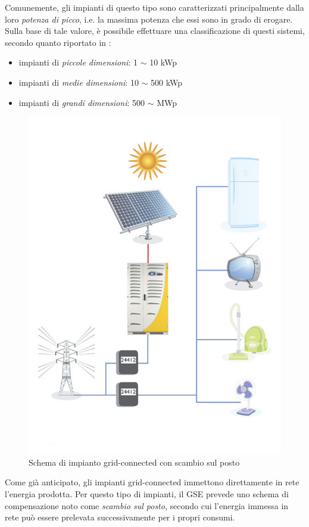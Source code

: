 %
Comunemente, gli impianti di questo tipo sono caratterizzati principalmente dalla 
loro \emph{potenza di picco}, i.e. la massima potenza che essi sono in grado di 
erogare. Sulla base di tale valore, \`e possibile effettuare una classificazione
di questi sistemi, secondo quanto riportato in \cite{castaner02}:
%
\begin{itemize}
\item impianti di \emph{piccole dimensioni}: 1 $\sim$  10 kWp
\item impianti di \emph{medie dimensioni}: 10 $\sim$ 500 kWp
\item impianti di \emph{grandi dimensioni}: 500 $\sim$ MWp 
\end{itemize}
\begin{figure}[!h]
\centering
\includegraphics[width=350pt]{img/impianto-grid-connect.jpg}
\caption{Schema di impianto grid-connected con scambio sul posto}
\label{impiantogridconnect}
\end{figure}
%

%
Come gi\`a anticipato, gli impianti grid-connected immettono direttamente in rete 
l'energia prodotta. Per questo tipo di impianti, il GSE prevede uno schema di compensazione 
noto come \emph{scambio sul posto}\cite{scambioposto}, secondo cui l'energia immessa 
in rete pu\`o essere prelevata successivamente per i propri consumi.
%

